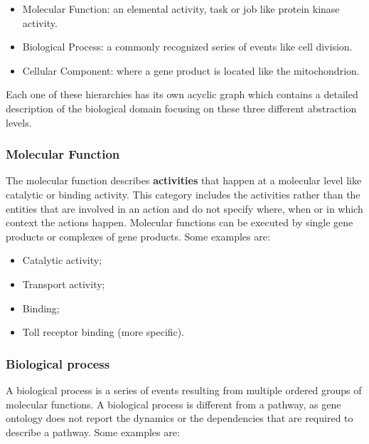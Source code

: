 	\begin{multicols}{2}
		\begin{itemize}
			\item Molecular Function: an elemental activity, task or job like protein kinase activity.
			\item Biological Process: a commonly recognized series of events like cell division.
			\item Cellular Component: where a gene product is located like the mitochondrion.
		\end{itemize}
	\end{multicols}

	Each one of these hierarchies has its own acyclic graph which contains a detailed description of the biological domain focusing on these three different abstraction levels.

		\subsubsection{Molecular Function}
		The molecular function describes \textbf{activities} that happen at a molecular level like catalytic or binding activity.
		This category includes the activities rather than the entities that are involved in an action and do not specify where, when or in which context the actions happen.
		Molecular functions can be executed by single gene products or complexes of gene products.
		Some examples are:

		\begin{multicols}{4}
			\begin{itemize}
				\item Catalytic activity;
				\item Transport activity;
				\item Binding;
				\item Toll receptor binding (more specific).
			\end{itemize}
		\end{multicols}

		\subsubsection{Biological process}
		A biological process is a series of events resulting from multiple ordered groups of molecular functions.
		A biological process is different from a pathway, as gene ontology does not report the dynamics or the dependencies that are required to describe a pathway.
		Some examples are:

